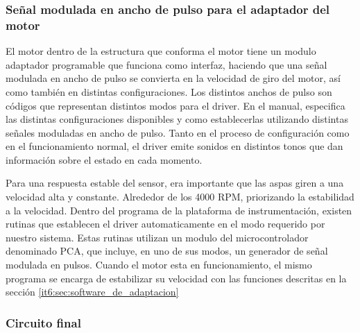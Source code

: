 
\subsubsection{Señal modulada en ancho de pulso para el adaptador del motor} %
\label{it6:ssub:señal_modulada_en_ancho_de_pulso_para_el_adaptador_del_motor}


El motor dentro de la estructura que conforma el motor tiene un modulo adaptador programable que funciona como interfaz, haciendo que una señal modulada en ancho de pulso se convierta en la velocidad de giro del motor, así como también en distintas configuraciones. Los distintos anchos de pulso son códigos que representan distintos modos para el driver. En el manual, especifica las distintas configuraciones disponibles y como establecerlas utilizando distintas señales moduladas en ancho de pulso. Tanto en el proceso de configuración como en el funcionamiento normal, el driver emite sonidos en distintos tonos que dan información sobre el estado en cada momento.

Para una respuesta estable del sensor, era importante que las aspas giren a una velocidad alta y constante. Alrededor de los 4000 RPM, priorizando la estabilidad a la velocidad. Dentro del programa de la plataforma de instrumentación, existen rutinas que establecen el driver automaticamente en el modo requerido por nuestro sistema. Estas rutinas utilizan un modulo del microcontrolador denominado PCA, que incluye, en uno de sus modos, un generador de señal modulada en pulsos. Cuando el motor esta en funcionamiento, el mismo programa se encarga de estabilizar su velocidad con las funciones descritas en la sección \ref{it6:sec:software_de_adaptacion}



\subsubsection{Circuito final} %
\label{it6:ssub:circuito_final}

